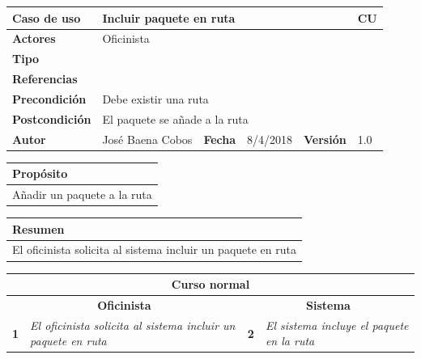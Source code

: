 \documentclass[12pt,spanish]{article}
\begin{document}
\begin{table}[H]
	\centering
	\begin{tabular}{|m{3cm}|m{4cm}|m{2cm}|m{2cm}|m{2cm}|m{1cm}|}
		\hline
		\textbf{Caso de uso} &  \multicolumn{4}{m{11cm}|}{Incluir paquete en ruta} \vline &  \cellcolor{gray!40}CU\arabic{contadorCU}  \stepcounter{contadorCU} \\
		\hline
		\textbf{Actores} & \multicolumn{5}{m{11cm}|}{Oficinista} \\
		\hline
		\textbf{Tipo} & \multicolumn{5}{m{11cm}|}{} \\
		\hline
		\textbf{Referencias} &\multicolumn{5}{m{11cm}|}{} \\
		\hline
		\textbf{Precondición} & \multicolumn{5}{m{11cm}|}{Debe existir una ruta} \\
		\hline
		\textbf{Postcondición} & \multicolumn{5}{m{11cm}|}{El paquete se añade a la ruta} \\
		\hline
		\textbf{Autor} & José Baena Cobos & \textbf{Fecha} & 8/4/2018 & \textbf{Versión} & 1.0 \\
		\hline
	\end{tabular}
	
	\vspace{1cm}
	
	\begin{tabular}{|m{16.2cm}|}
		\hline
		\textbf{Propósito} \\
		\hline
		Añadir un paquete a la ruta\\
		\hline
	\end{tabular}
	
	\vspace{1cm}
	
	\begin{tabular}{|m{16.2cm}|}
		\hline
		\textbf{Resumen} \\
		\hline
		El oficinista solicita al sistema incluir un paquete en ruta\\
		\hline
	\end{tabular}
	
	\vspace{1cm}
	
	\begin{tabular}{|m{5pt}|m{7.33cm}|m{5pt}|m{7.33cm}|}
		\hline
		\multicolumn{4}{|c|}{\textbf{Curso normal}} \\
		\hline
		\multicolumn{2}{|c}{\textbf{Oficinista}} & \multicolumn{2}{|c|}{\textbf{Sistema}} \\
		\hline
		\textbf{1} & \textit{El oficinista solicita al sistema incluir un paquete en ruta} & \textbf{2} & \textit{El sistema incluye el paquete en la ruta} \\
		\hline
	

\end{tabular}
\end{table}
\end{document}
